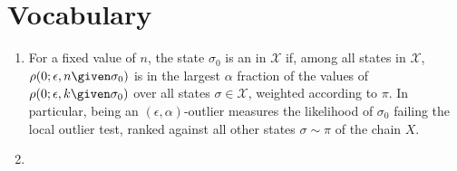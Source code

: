 \documentclass[12pt]{article}
\begin{document}
\hr

\section*{Vocabulary}
\begin{enumerate}
  \item     For a fixed value of \( n \), the state \( \sigma_0 \) is an  in \( \mathcal{X} \) if, among all
    states in \( \mathcal{X} \), \( \rho(0; \epsilon, n \given \sigma_{0})
    \) is in the largest \( \alpha \) fraction of the values of \( \rho(0;
    \epsilon, k \given \sigma_{0}) \) over all states \( \sigma \in
    \mathcal{X} \), weighted according to \( \pi \).  In particular,
    being an \( (\epsilon, \alpha) \)-outlier measures the likelihood of
    \( \sigma_0 \) failing the local outlier test, ranked against all
    other states \( \sigma \sim \pi \) of the chain \( X \).
  \item 
\end{enumerate}

\hr
\end{document}
